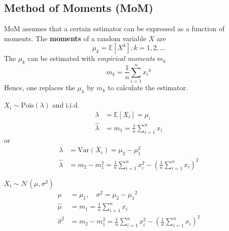\subsection{Method of Moments (MoM)}
MoM assumes that a certain estimator can be expressed as a function of moments.
The \textbf{moments} of a random variable $X$ are
\noindent\begin{equation*}
    \mu_k=\mathbb{E}[X^k],k=1,2,\ldots
\end{equation*}
The $\mu_k$ can be estimated with \textit{empirical moments} $m_k$
\noindent\begin{equation*}
    m_k=\frac{1}{n}\sum_{i=1}^n {x_i}^k
\end{equation*}
Hence, one replaces the $\mu_k$ by $m_k$ to calculate the estimator.

\begin{examplesection}
    $X_i \sim \text{Pois}(\lambda)$ and i.i.d.
    \noindent\begin{align*}
        \lambda       & = \mathbb{E}[X_i] = \mu_i            \\
        \hat{\lambda} & = m_1 =\frac{1}{n}\sum_{i=1}^n {x_i}
    \end{align*}
    or
    \noindent\begin{align*}
        \lambda       & = \mathrm{Var}(X_i)=\mu_2-\mu_1^2                                                     \\
        \hat{\lambda} & =m_2-m_1^2=\frac{1}{n}\sum_{i=1}^n x_i^2-{\left(\frac{1}{n}\sum_{i=1}^n x_i\right)}^2
    \end{align*}

    $X_i \sim \mathcal{N}(\mu,\sigma^2)$
    \noindent\begin{align*}
        \mu            & = \mu_1, \quad \sigma^2 = \mu_2-{\mu_1}^2                                             \\
        \hat{\mu}      & =m_1=\frac{1}{n}\sum_{i=1}^n x_i                                                      \\
        \hat{\sigma}^2 & =m_2-m_1^2=\frac{1}{n}\sum_{i=1}^n x_i^2-{\left(\frac{1}{n}\sum_{i=1}^n x_i\right)}^2
    \end{align*}
\end{examplesection}

